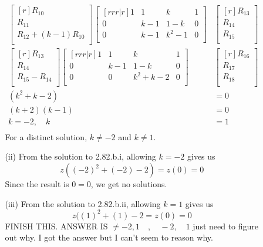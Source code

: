 \documentclass{report}
\theoremstyle{plain}
\theoremstyle{definition}
\theoremstyle{plain}
\begin{document}
\begin{enumerate}
\begin{enumerate}
\begin{enumerate}
\begin{align*}
\begin{bmatrix}[r]
		R_{10}\\
		R_{11}\\
		R_{12} + (k-1)R_{10}\\	
		\end{bmatrix}
		\begin{bmatrix}[rrr|r]
		1 & 1 & k & 1\\
		0 & k-1 & 1-k & 0\\
		0 & k-1 & k^2-1 & 0\\
		\end{bmatrix}&
		\begin{bmatrix}[r]
		R_{13}\\ R_{14}\\ R_{15}\\
		\end{bmatrix}\\
		\begin{bmatrix}[r]
		R_{13}\\
		R_{14}\\
		R_{15} - R_{14}\\
		\end{bmatrix}
		\begin{bmatrix}[rrr|r]
		1 & 1 & k & 1\\
		0 & k-1 & 1-k & 0\\
		0 & 0 & k^2+k-2 & 0\\
		\end{bmatrix}&
		\begin{bmatrix}[r]
		R_{16}\\ R_{17}\\ R_{18}\\
		\end{bmatrix}\\
		(k^2+k-2) &=0\\
		(k+2)(k-1) &=0\\
		k = -2, \quad k &= 1\\
		\end{align*}
		For a distinct solution, $k \neq -2$ and $k \neq 1$.\\
		\item [(ii)]
		From the solution to 2.82.b.i, allowing $k=-2$ gives us
		\[ z((-2)^2+(-2)-2) = z(0) = 0 \]
		Since the result is $0 = 0$, we get no solutions.\\
		\item [(iii)]
		From the solution to 2.82.b.ii, allowing $k=1$ gives us
		\[ z((1)^2 + (1) - 2 = z(0) = 0 \]
		FINISH THIS. ANSWER IS $\neq -2, 1 \quad , \quad -2, \quad 1$ just need to figure out why. I got the answer but I can't seem to reason why.

\end{enumerate}
\end{enumerate}
\end{enumerate}
\end{document}
